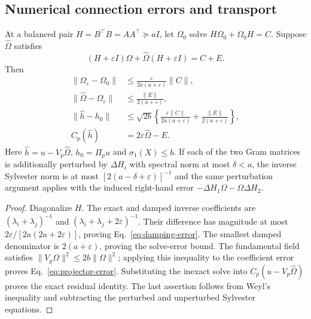 \subsection{Numerical connection errors and transport}
\begin{proposition}
\label{prop:connection-error}
At a balanced pair $H=B^\top B=AA^\top\succeq aI$, let $\Omega_0$
solve $H\Omega_0+\Omega_0H=C$. Suppose $\widehat\Omega$ satisfies
\begin{equation}
 (H+\varepsilon I)\widehat\Omega+
 \widehat\Omega(H+\varepsilon I)=C+E.
\end{equation}
Then
\begin{align}
 \|\Omega_\varepsilon-\Omega_0\|
 &\leq\frac{\varepsilon}{2a(a+\varepsilon)}\|C\|,
 \label{eq:damping-error}\\
 \|\widehat\Omega-\Omega_\varepsilon\|
 &\leq\frac{\|E\|}{2(a+\varepsilon)},\\
 \|\widehat h-h_0\|
 &\leq\sqrt{2b}\left\{
 \frac{\varepsilon\|C\|}{2a(a+\varepsilon)}+
 \frac{\|E\|}{2(a+\varepsilon)}\right\},
 \label{eq:projector-error}\\
 C_p(\widehat h)&=2\varepsilon\widehat\Omega-E.
 \label{eq:damping-residual-exact}
\end{align}
Here $\widehat h=u-V_p\widehat\Omega$, $h_0=\Pi_pu$ and
$\sigma_1(X)\leq b$. If each of the two Gram matrices is additionally
perturbed by $\Delta H_i$ with spectral norm at most $\delta<a$, the
inverse Sylvester norm is at most $[2(a-\delta+\varepsilon)]^{-1}$
and the same perturbation argument applies with the induced right-hand
error $-\Delta H_1\Omega-\Omega\Delta H_2$.
\end{proposition}
\begin{proof}
Diagonalize $H$. The exact and damped inverse coefficients are
$(\lambda_i+\lambda_j)^{-1}$ and
$(\lambda_i+\lambda_j+2\varepsilon)^{-1}$. Their difference has magnitude
at most $2\varepsilon/[2a(2a+2\varepsilon)]$, proving
Eq.~\eqref{eq:damping-error}. The smallest damped denominator is
$2(a+\varepsilon)$, proving the solve-error bound. The fundamental
field satisfies
$\|V_p\Omega\|^2\leq2b\|\Omega\|^2$; applying this inequality to the
coefficient error proves Eq.~\eqref{eq:projector-error}. Substituting the
inexact solve into $C_p(u-V_p\widehat\Omega)$ proves the exact residual
identity. The last assertion follows from Weyl's inequality and subtracting
the perturbed and unperturbed Sylvester equations.
\end{proof}

